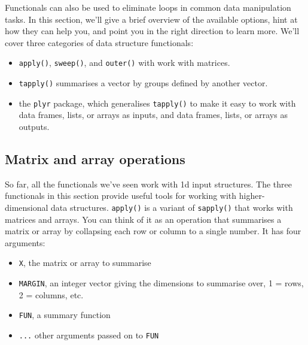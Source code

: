 
Functionals can also be used to eliminate loops in common data
manipulation tasks. In this section, we'll give a brief overview of the
available options, hint at how they can help you, and point you in the
right direction to learn more. We'll cover three categories of data
structure functionals:

\begin{itemize}
\item
  \texttt{apply()}, \texttt{sweep()}, and \texttt{outer()} with work
  with matrices.
\item
  \texttt{tapply()} summarises a vector by groups defined by another
  vector.
\item
  the \texttt{plyr} package, which generalises \texttt{tapply()} to make
  it easy to work with data frames, lists, or arrays as inputs, and data
  frames, lists, or arrays as outputs.
\end{itemize}

\subsection{Matrix and array operations}

So far, all the functionals we've seen work with 1d input structures.
The three functionals in this section provide useful tools for working
with higher-dimensional data structures. \texttt{apply()} is a variant
of \texttt{sapply()} that works with matrices and arrays. You can think
of it as an operation that summarises a matrix or array by collapsing
each row or column to a single number. It has four arguments:

\begin{itemize}
\itemsep1pt\parskip0pt
\item
  \texttt{X}, the matrix or array to summarise
\item
  \texttt{MARGIN}, an integer vector giving the dimensions to summarise
  over, 1 = rows, 2 = columns, etc.
\item
  \texttt{FUN}, a summary function
\item
  \texttt{...} other arguments passed on to \texttt{FUN}
\end{itemize}

